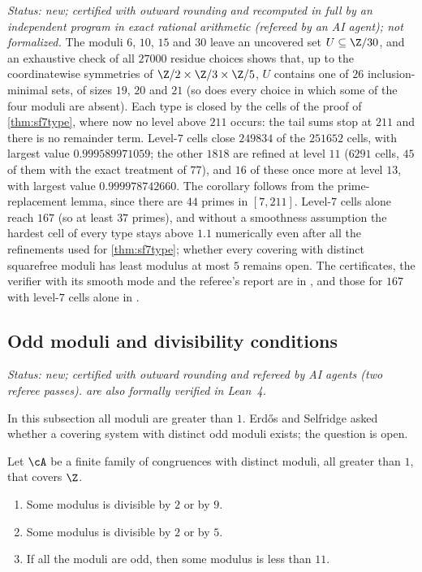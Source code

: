 \emph{Status: new; certified with outward rounding and recomputed in full by an independent program in exact
rational arithmetic (refereed by an AI agent); not formalized.} The moduli $6$, $10$, $15$ and $30$ leave an uncovered
set $U\subseteq\Z/30$, and an exhaustive check of all $27000$ residue choices shows that, up to the coordinatewise
symmetries of $\Z/2\times\Z/3\times\Z/5$, $U$ contains one of $26$ inclusion-minimal sets, of sizes $19$, $20$ and
$21$ (so does every choice in which some of the four moduli are absent). Each type is closed by the cells of the
proof of \cref{thm:sf7type}, where now no level above $211$ occurs: the tail sums stop at $211$ and there is no
remainder term. Level-$7$ cells close $249834$ of the $251652$ cells, with largest value $0.999589971059$; the other
$1818$ are refined at level $11$ ($6291$ cells, $45$ of them with the exact treatment of $77$), and $16$ of these once
more at level $13$, with largest value $0.999978742660$. The corollary follows from the prime-replacement lemma, since
there are $44$ primes in $[7,211]$. Level-$7$ cells alone reach $167$ (so at least $37$ primes), and without a
smoothness assumption the hardest cell of every type stays above $1.1$ numerically even after all the refinements used
for \cref{thm:sf7type}; whether every covering with distinct squarefree moduli has least modulus at most $5$ remains
open. The certificates, the verifier with its smooth mode and the referee's report are in
, and those for $167$ with level-$7$ cells alone in
.

\subsection{Odd moduli and divisibility conditions}\label{sec:odd}

\emph{Status: new; certified with outward rounding and refereed by AI agents (two referee passes).
 are also formally verified in Lean~4.}

In this subsection all moduli are greater than $1$. Erd\H{o}s and Selfridge asked whether a covering system with
distinct odd moduli exists; the question is open.

\begin{theorem}\label{thm:odd}
Let $\cA$ be a finite family of congruences with distinct moduli, all greater than $1$, that covers $\Z$.
\begin{enumerate}[label=(\Alph*)]
\item Some modulus is divisible by $2$ or by $9$.
\item Some modulus is divisible by $2$ or by $5$.
\item If all the moduli are odd, then some modulus is less than $11$.
\end{enumerate}
\end{theorem}

